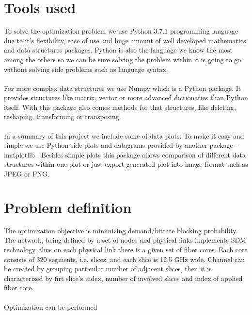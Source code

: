 \documentclass[conference]{IEEEtran}
\begin{document}
\section{Tools used}
To solve the optimization problem we use Python 3.7.1 \cite{python} programming language due to it's flexibility, ease of use and huge amount of well developed mathematics and data structures packages. Python is also the language we know the most among the others so we can be sure solving the problem within it is going to go without solving side problems such as language syntax.
\\ \\
For more complex data structures we use Numpy \cite{numpy} which is a Python package. It provides structures like matrix, vector or more advanced dictionaries than Python itself. With this package also comes methods for that structures, like deleting, reshaping, transforming or transposing.
\\ \\
In a summary of this project we include some of data plots. To make it easy and simple we use Python side plots and datagrams provided by another package - matplotlib \cite{matplotlib}. Besides simple plots this package allows comparison of different data structures within one plot or just export generated plot into image format such as JPEG or PNG.
\\

\section{Problem definition}
The optimization objective is minimizing demand/bitrate blocking probability. The network, being defined by a set of nodes and physical links implements SDM technology, thus on each physical link there is a given set of fiber cores. Each core consists of 320 segments, i.e. slices, and each slice is 12.5 GHz wide. Channel can be created by grouping particular number of adjacent slices, then it is characterized by firt slice's index, number of involved slices and index of applied fiber core.
\\ \\
Optimization can be performed 
\\
\end{document}
